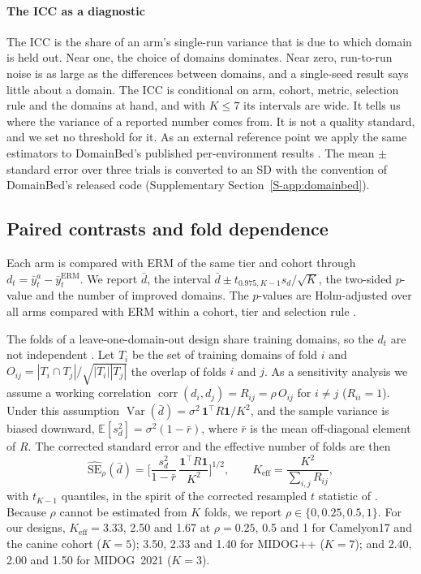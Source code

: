 \paragraph{The ICC as a diagnostic} The ICC is the share of an arm's
single-run variance that is due to which domain is held out. Near one, the
choice of domains dominates. Near zero, run-to-run noise is as large as the
differences between domains, and a single-seed result says little about a
domain. The ICC is conditional on arm, cohort, metric, selection rule and the
domains at hand, and with $K\le7$ its intervals are wide. It tells us where the
variance of a reported number comes from. It is not a quality standard, and we
set no threshold for it. As an external reference point we apply the same
estimators to DomainBed's published per-environment results
\citep{gulrajani2021domainbed}. The mean $\pm$ standard error over three
trials is converted to an SD with the convention of DomainBed's released code
(Supplementary Section~\ref{S-app:domainbed}).

\subsection{Paired contrasts and fold dependence}
\label{sec:protocol-contrasts}

Each arm is compared with ERM of the same tier and cohort through
$d_t=\bar y^{a}_t-\bar y^{\text{ERM}}_t$. We report $\bar d$, the interval
$\bar d\pm t_{0.975,K-1}s_d/\sqrt K$, the two-sided $p$-value and the number of
improved domains. The $p$-values are Holm-adjusted over all arms compared with
ERM within a cohort, tier and selection rule \citep{holm1979}.

The folds of a leave-one-domain-out design share training domains, so the
$d_t$ are not independent \citep{nadeau2003inference,bates2023cv}. Let $T_i$ be
the set of training domains of fold $i$ and
$O_{ij}=|T_i\cap T_j|/\sqrt{|T_i||T_j|}$ the overlap of folds $i$ and $j$. As
a sensitivity analysis we assume a working correlation
$\operatorname{corr}(d_i,d_j)=R_{ij}=\rho\,O_{ij}$ for $i\ne j$
($R_{ii}=1$). Under this assumption
$\operatorname{Var}(\bar d)=\sigma^2\,\mathbf 1^\top R\mathbf 1/K^2$, and the
sample variance is biased downward,
$\mathbb E[s_d^2]=\sigma^2(1-\bar r)$, where $\bar r$ is the mean off-diagonal
element of $R$. The corrected standard error and the effective number of folds
are then
\begin{equation}
  \widehat{\mathrm{SE}}_\rho(\bar d)=\Big[\frac{s_d^2}{1-\bar r}\,
  \frac{\mathbf 1^\top R\mathbf 1}{K^2}\Big]^{1/2},\qquad
  K_{\text{eff}}=\frac{K^2}{\sum_{i,j}R_{ij}},
  \label{eq:keff}
\end{equation}
with $t_{K-1}$ quantiles, in the spirit of the corrected resampled $t$
statistic of \citet{nadeau2003inference}. Because $\rho$ cannot be estimated
from $K$ folds, we report $\rho\in\{0,0.25,0.5,1\}$. For our designs,
$K_{\text{eff}}=3.33$, 2.50 and 1.67 at $\rho=0.25$, 0.5 and 1 for Camelyon17
and the canine cohort ($K=5$); 3.50, 2.33 and 1.40 for MIDOG++ ($K=7$); and
2.40, 2.00 and 1.50 for MIDOG~2021 ($K=3$).

